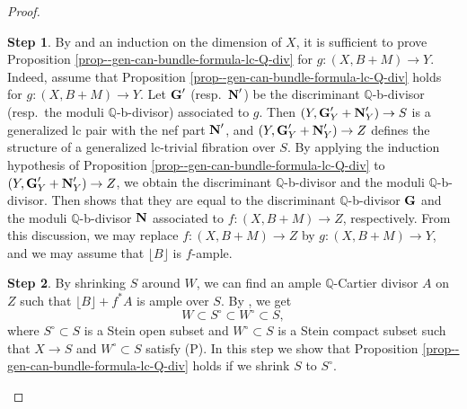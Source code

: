 \documentclass[12pt]{amsart}
\theoremstyle{definition}
\newtheorem{step2}{Step}
\begin{document}
\begin{proof}
\begin{step2}
By \cite[Lemma 5.1]{filipazzi-gen-can-bundle-formula} and an induction on the dimension of $X$, it is sufficient to prove Proposition \ref{prop--gen-can-bundle-formula-lc-Q-div} for $g \colon (X,B+M) \to Y$. 
Indeed, assume that Proposition \ref{prop--gen-can-bundle-formula-lc-Q-div} holds for $g \colon (X,B+M) \to Y$. 
Let $\boldsymbol{\rm G}'$ (resp.~$\boldsymbol{\rm N}'$) be the discriminant $\mathbb{Q}$-b-divisor (resp.~the moduli $\mathbb{Q}$-b-divisor) associated to $g$. 
Then $(Y,\boldsymbol{\rm G}'_{Y}+\boldsymbol{\rm N}'_{Y}) \to S$ is a generalized lc pair with the nef part $\boldsymbol{\rm N}'$, and 
$(Y,\boldsymbol{\rm G}'_{Y}+\boldsymbol{\rm N}'_{Y}) \to Z$ defines the structure of a generalized lc-trivial fibration over $S$. 
By applying the induction hypothesis of Proposition \ref{prop--gen-can-bundle-formula-lc-Q-div} to $(Y,\boldsymbol{\rm G}'_{Y}+\boldsymbol{\rm N}'_{Y}) \to Z$, we obtain the discriminant $\mathbb{Q}$-b-divisor and the moduli $\mathbb{Q}$-b-divisor. 
Then \cite[Lemma 5.1]{filipazzi-gen-can-bundle-formula} shows that they are equal to the discriminant $\mathbb{Q}$-b-divisor $\boldsymbol{\rm G}$ and the moduli $\mathbb{Q}$-b-divisor $\boldsymbol{\rm N}$ associated to $f\colon (X,B+M) \to Z$, respectively. 
From this discussion, we may replace $f\colon (X,B+M) \to Z$ by $g \colon (X,B+M) \to Y$, and we may assume that $\lfloor B \rfloor$ is $f$-ample. 
\end{step2}

\begin{step2}\label{step3--prop-gen-can-bundle-formula-lc-Q-div}
By shrinking $S$ around $W$, we can find an ample $\mathbb{Q}$-Cartier divisor $A$ on $Z$ such that $\lfloor B \rfloor+f^{*}A$ is ample over $S$. 
By \cite[Lemma 2.16]{fujino-analytic-bchm}, we get
$$W \subset S^{\circ} \subset W^{\circ} \subset S,$$
where $S^{\circ} \subset S$ is a Stein open subset and $W^{\circ} \subset S$ is a Stein compact subset such that $X \to S$ and $W^{\circ} \subset S$ satisfy (P). 
In this step we show that Proposition \ref{prop--gen-can-bundle-formula-lc-Q-div} holds if we shrink $S$ to $S^{\circ}$. 


\end{step2}
\end{proof}
\end{document}
